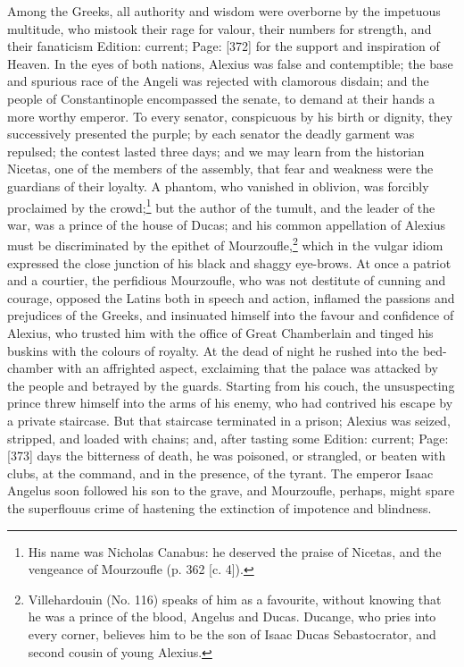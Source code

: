 Among the Greeks, all authority and wisdom were overborne by the impetuous multitude, who mistook their rage for valour, their numbers for strength, and their fanaticism Edition: current; Page: [372] for the support and inspiration of Heaven. In the eyes of both nations, Alexius was false and contemptible; the base and spurious race of the Angeli was rejected with clamorous disdain; and the people of Constantinople encompassed the senate, to demand at their hands a more worthy emperor. To every senator, conspicuous by his birth or dignity, they successively presented the purple; by each senator the deadly garment was repulsed; the contest lasted three days; and we may learn from the historian Nicetas, one of the members of the assembly, that fear and weakness were the guardians of their loyalty. A phantom, who vanished in oblivion, was forcibly proclaimed by the crowd;\footnote{His name was Nicholas Canabus: he deserved the praise of Nicetas, and the vengeance of Mourzoufle (p. 362 [c. 4]).} but the author of the tumult, and the leader of the war, was a prince of the house of Ducas; and his common appellation of Alexius must be discriminated by the epithet of Mourzoufle,\footnote{Villehardouin (No. 116) speaks of him as a favourite, without knowing that he was a prince of the blood, Angelus and Ducas. Ducange, who pries into every corner, believes him to be the son of Isaac Ducas Sebastocrator, and second cousin of young Alexius.} which in the vulgar idiom expressed the close junction of his black and shaggy eye-brows. At once a patriot and a courtier, the perfidious Mourzoufle, who was not destitute of cunning and courage, opposed the Latins both in speech and action, inflamed the passions and prejudices of the Greeks, and insinuated himself into the favour and confidence of Alexius, who trusted him with the office of Great Chamberlain and tinged his buskins with the colours of royalty. At the dead of night he rushed into the bed-chamber with an affrighted aspect, exclaiming that the palace was attacked by the people and betrayed by the guards. Starting from his couch, the unsuspecting prince threw himself into the arms of his enemy, who had contrived his escape by a private staircase. But that staircase terminated in a prison; Alexius was seized, stripped, and loaded with chains; and, after tasting some Edition: current; Page: [373] days the bitterness of death, he was poisoned, or strangled, or beaten with clubs, at the command, and in the presence, of the tyrant. The emperor Isaac Angelus soon followed his son to the grave, and Mourzoufle, perhaps, might spare the superflouus crime of hastening the extinction of impotence and blindness.

